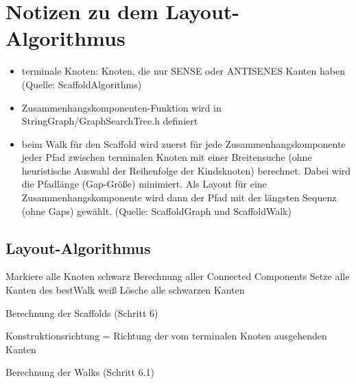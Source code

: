 \documentclass[a4paper,10pt,parskip]{scrartcl}
\begin{document}
\section{Notizen zu dem Layout-Algorithmus}

\begin{itemize}
\item terminale Knoten: Knoten, die nur SENSE oder ANTISENES Kanten
  haben (Quelle: ScaffoldAlgorithms)
\item Zusammenhangskomponenten-Funktion wird in
  StringGraph/GraphSearchTree.h definiert
\item beim Walk für den Scaffold wird zuerst für jede
  Zusammenhangskomponente jeder Pfad zwischen terminalen Knoten mit
  einer Breitensuche (ohne heuristische Auswahl der Reihenfolge der
  Kindsknoten) berechnet. Dabei wird die Pfadlänge (Gap-Größe)
  minimiert. Als Layout für eine Zusammenhangskomponente wird dann
  der Pfad mit der längsten Sequenz (ohne Gaps) gewählt. (Quelle:
  ScaffoldGraph und ScaffoldWalk)
\end{itemize}

\subsection{Layout-Algorithmus}

\begin{algorithm}[H]
  \SetAlgoLined
  Markiere alle Knoten schwarz\;
  Berechnung aller Connected Components\;
  Setze alle Kanten des bestWalk weiß\;
  Lösche alle schwarzen Kanten\;
  \caption{Berechnung der Scaffolds (Schritt 6)}
\end{algorithm}

\begin{algorithm}[H]
  \SetAlgoLined
  Konstruktionsrichtung = Richtung der vom terminalen Knoten ausgehenden Kanten\;
  \caption{Berechnung der Walks (Schritt 6.1)}
\end{algorithm}
\end{document}
